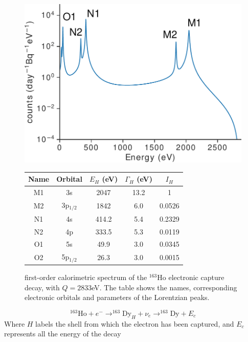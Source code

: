 \begin{figure}[t]
  \begin{minipage}{0.43\linewidth}
    \includegraphics[width=\linewidth]{figures/ch1/Ho.pdf}
  \end{minipage}
  \hfill
  \begin{minipage}{0.58\linewidth}
      \centering
      \begin{tabular}{|c|c|c|c|c|}
        \hline
        Name & Orbital & \(E_H\) (eV) & \(\Gamma_H\) (eV) & $I_H$ \\
        \hline
        M1 & 3s & 2047 & 13.2 & 1 \\
        M2 & 3p$_{1 / 2}$ & 1842 & 6.0 & 0.0526 \\
        N1 & 4s & 414.2 & 5.4 & 0.2329 \\
        N2 & 4p & 333.5 & 5.3 & 0.0119 \\
        O1 & 5s & 49.9 & 3.0 & 0.0345 \\
        O2 & 5p$_{1 / 2}$ & 26.3 & 3.0 & 0.0015 \\
        \hline
    \end{tabular}
  \end{minipage}
\caption{first-order calorimetric spectrum of the $^{163}$Ho electronic capture decay, with $Q=2833$eV. The table shows
the names, corresponding electronic orbitals and parameters of the Lorentzian peaks.}
\label{fig:Hofirstorder}
\end{figure}
\begin{equation}
  ^{163}\text{Ho} + e^- \rightarrow ^{163}\text{Dy}_H + \nu_e \rightarrow ^{163}\text{Dy} + E_c
\end{equation}
Where $H$ labels the shell from which the electron has been captured, and $E_c$ represents all the energy of the decay
